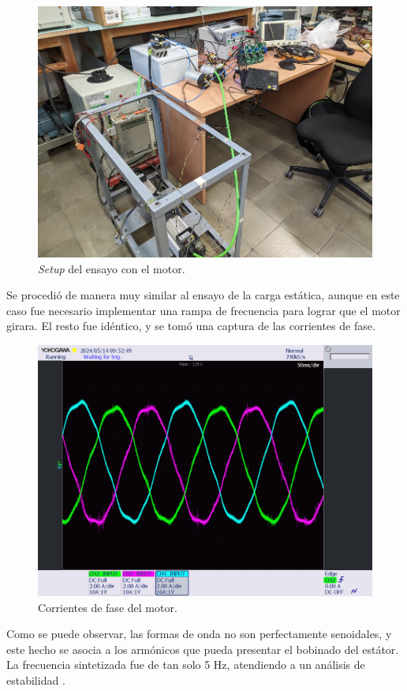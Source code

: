 \begin{figure}[H]
	\centering
	\includegraphics[width=0.7\linewidth]{fig/Mavilor-setup}
	\caption{\textit{Setup} del ensayo con el motor.}
\end{figure}

Se procedió de manera muy similar al ensayo de la carga estática, aunque en este caso fue necesario implementar una rampa de frecuencia para lograr que el motor girara. El resto fue idéntico, y se tomó una captura de las corrientes de fase.


\begin{figure}[H]
	\centering
	\includegraphics[width=0.7\linewidth]{fig/mavilorCurrent}
	\caption{Corrientes de fase del motor.}
\end{figure}

Como se puede observar, las formas de onda no son perfectamente senoidales, y este hecho se asocia a los armónicos que pueda presentar el bobinado del estátor. La frecuencia sintetizada fue de tan solo 5 Hz, atendiendo a un análisis de estabilidad \cite{Montesinos2008}.


